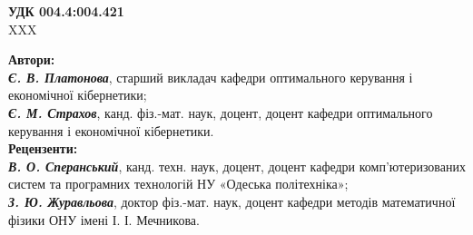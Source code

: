 \begin{titlepage}
	\large
	\raggedright \Large {\textbf{УДК 004.4:004.421 }\\
		\hspace*{1 cm} XXX}
	
	\bigskip
	\justifying
	\large
	\hspace{1cm}\textbf{Автори:}\\
   	\textbf{\textit{Є. В. Платонова}}, старший викладач кафедри оптимального керування і економічної кібернетики;\\ 
	\textbf{\textit{Є. М. Страхов}}, канд. фіз.-мат. наук, доцент, доцент кафедри оптимального керування і економічної кібернетики.\\ 
	\medskip
	\hspace{1cm}\textbf{Рецензенти:}\\
	\textbf{\textit{В. О. Сперанський}}, канд. техн. наук, доцент, доцент кафедри комп’ютеризованих систем та програмних технологій НУ «Одеська політехніка»;\\
	\textbf{\textit{З. Ю. Журавльова}}, доктор фіз.-мат. наук, доцент кафедри методів математичної фізики ОНУ імені І. І. Мечникова.
	
	
	
	\bigskip
	\medskip
	

\end{titlepage}

